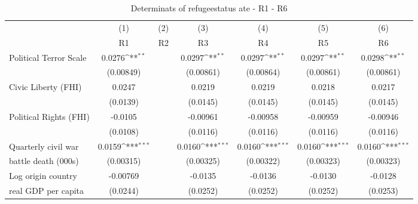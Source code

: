 \begin{table}[!ht]\centering \scriptsize
\def\sym#1{\ifmmode^{#1}\else\(^{#1}\)\fi}
\caption{Determinats of refugeestatus ate - R1 - R6}
\begin{tabular}{l*{6}{c}}
\hline\hline
	&\multicolumn{1}{c}{(1)}     &\multicolumn{1}{c}{(2)}       &\multicolumn{1}{c}{(3)}       &\multicolumn{1}{c}{(4)}    	&\multicolumn{1}{c}{(5)}  	&\multicolumn{1}{c}{(6)}   \\
                   &\multicolumn{1}{c}{R1}&\multicolumn{1}{c}{R2}&\multicolumn{1}{c}{R3}&\multicolumn{1}{c}{R4}&\multicolumn{1}{c}{R5}&\multicolumn{1}{c}{R6}\\
\hline
Political Terror Scale&      0.0276\sym{**} &                     &      0.0297\sym{**} &      0.0297\sym{**} &      0.0297\sym{**} &      0.0298\sym{**} \\
                    &   (0.00849)         &                     &   (0.00861)         &   (0.00864)         &   (0.00861)         &   (0.00861)         \\
[0,5em]
Civic Liberty (FHI) &      0.0247         &                     &      0.0219         &      0.0219         &      0.0218         &      0.0217         \\
                    &    (0.0139)         &                     &    (0.0145)         &    (0.0145)         &    (0.0145)         &    (0.0145)         \\
[0,5em]
Political Rights (FHI)&     -0.0105         &                     &    -0.00961         &    -0.00958         &    -0.00959         &    -0.00946         \\
                    &    (0.0108)         &                     &    (0.0116)         &    (0.0116)         &    (0.0116)         &    (0.0116)         \\
[0,5em]
Quarterly civil war &      0.0159\sym{***}&                     &      0.0160\sym{***}&      0.0160\sym{***}&      0.0160\sym{***}&      0.0160\sym{***}\\
battle death (000s)                    &   (0.00315)         &                     &   (0.00325)         &   (0.00322)         &   (0.00323)         &   (0.00323)         \\
[0,5em]
Log origin country &    -0.00769         &                     &     -0.0135         &     -0.0136         &     -0.0130         &     -0.0128         \\
real GDP per capita                    &    (0.0244)         &                     &    (0.0252)         &    (0.0252)         &    (0.0252)         &    (0.0253)         \\

\end{tabular}
\end{table}
